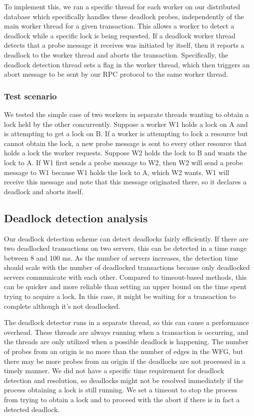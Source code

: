\documentclass[a4paper, 10pt, notitlepage]{report}
\begin{document}
To implement this, we ran a specific thread for each worker on our distributed database which specifically handles these deadlock probes, independently of the main worker thread for a given transaction. This allows a worker to detect a deadlock while a specific lock is being requested. If a deadlock worker thread detects that a probe message it receives was initiated by itself, then it reports a deadlock to the worker thread and aborts the transaction. Specifically, the deadlock detection thread sets a flag in the worker thread, which then triggers an abort message to be sent by our RPC protocol to the same worker thread.

\subsubsection*{Test scenario}

We tested the simple case of two workers in separate threads wanting to obtain a lock held by the other concurrently. Suppose a worker W1 holds a lock on A and is attempting to get a lock on B. If a worker is attempting to lock a resource but cannot obtain the lock, a new probe message is sent to every other resource that holds a lock the worker requests. Suppose W2 holds the lock to B and wants the lock to A. If W1 first sends a probe message to W2, then W2 will send a probe message to W1 because W1 holds the lock to A, which W2 wants. W1 will receive this message and note that this message originated there, so it declares a deadlock and aborts itself.

\subsection*{Deadlock detection analysis}
Our deadlock detection scheme can detect deadlocks fairly efficiently. If there are two deadlocked transactions on two servers, this can be detected in a time range between 8 and 100 ms. As the number of servers increases, the detection time should scale with the number of deadlocked transactions because only deadlocked servers communicate with each other. Compared to timeout-based methods, this can be quicker and more reliable than setting an upper bound on the time spent trying to acquire a lock. In this case, it might be waiting for a transaction to complete although it's not deadlocked.

The deadlock detector runs in a separate thread, so this can cause a performance overhead. These threads are always running when a transaction is occurring, and the threads are only utilized when a possible deadlock is happening. The number of probes from an origin is no more than the number of edges in the WFG, but there may be more probes from an origin if the deadlocks are not processed in a timely manner. We did not have a specific time requirement for deadlock detection and resolution, so deadlocks might not be resolved immediately if the process obtaining a lock is still running. We set a timeout to stop the process from trying to obtain a lock and to proceed with the abort if there is in fact a detected deadlock.
\end{document}
